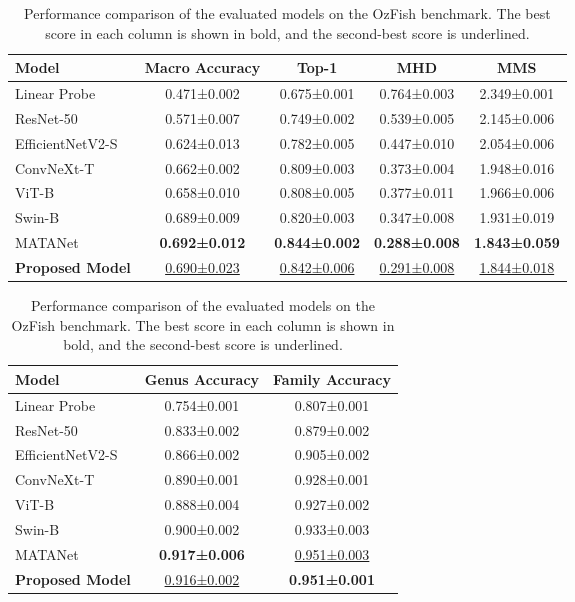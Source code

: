 \documentclass[preprint,12pt]{elsarticle}
\begin{document}
\begin{table}[H]
\centering
\caption{Performance comparison of the evaluated models on the OzFish benchmark. The best score in each column is shown in bold, and the second-best score is underlined.}\label{tab:main-results}
\footnotesize
\begin{tabular*}{\textwidth}{@{\extracolsep{\fill}}lcccc@{}}
\toprule
Model & Macro Accuracy & Top-1 & MHD & MMS \\
\midrule
Linear Probe & 0.471±0.002 & 0.675±0.001 & 0.764±0.003 & 2.349±0.001 \\
ResNet-50 & 0.571±0.007 & 0.749±0.002 & 0.539±0.005 & 2.145±0.006 \\
EfficientNetV2-S & 0.624±0.013 & 0.782±0.005 & 0.447±0.010 & 2.054±0.006 \\
ConvNeXt-T & 0.662±0.002 & 0.809±0.003 & 0.373±0.004 & 1.948±0.016 \\
ViT-B & 0.658±0.010 & 0.808±0.005 & 0.377±0.011 & 1.966±0.006 \\
Swin-B & 0.689±0.009 & 0.820±0.003 & 0.347±0.008 & 1.931±0.019 \\
MATANet & \textbf{0.692±0.012} & \textbf{0.844±0.002} & \textbf{0.288±0.008} & \textbf{1.843±0.059} \\
\textbf{Proposed Model} & \uline{0.690±0.023} & \uline{0.842±0.006} & \uline{0.291±0.008} & \uline{1.844±0.018} \\
\bottomrule
\end{tabular*}

\vspace{6pt}

\begin{tabular*}{\textwidth}{@{\extracolsep{\fill}}lcc@{}}
\toprule
Model & Genus Accuracy & Family Accuracy \\
\midrule
Linear Probe & 0.754±0.001 & 0.807±0.001 \\
ResNet-50 & 0.833±0.002 & 0.879±0.002 \\
EfficientNetV2-S & 0.866±0.002 & 0.905±0.002 \\
ConvNeXt-T & 0.890±0.001 & 0.928±0.001 \\
ViT-B & 0.888±0.004 & 0.927±0.002 \\
Swin-B & 0.900±0.002 & 0.933±0.003 \\
MATANet & \textbf{0.917±0.006} & \uline{0.951±0.003} \\
\textbf{Proposed Model} & \uline{0.916±0.002} & \textbf{0.951±0.001} \\
\bottomrule
\end{tabular*}
\end{table}
\end{document}
